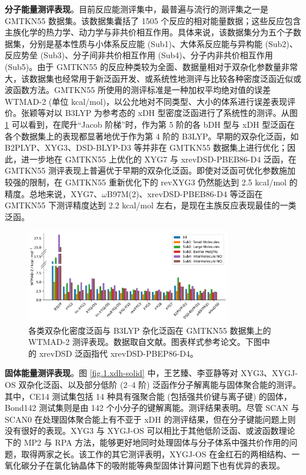 \textbf{分子能量测评表现}。目前反应能测评集中，最普遍与流行的测评集之一是 GMTKN55 数据集\cite{Goerigk-Grimme.PCCP.2017}。该数据集囊括了 1505 个反应的相对能量数据；这些反应包含主族化学的热力学、动力学与非共价相互作用。具体来说，该数据集分为五个子数据集，分别是基本性质与小体系反应能 (Sub1)、大体系反应能与异构能 (Sub2)、反应势垒 (Sub3)、分子间非共价相互作用 (Sub4)、分子内非共价相互作用 (Sub5)。由于 GMTKN55 的反应种类较为全面、数据量相对于双杂化参数量非常大，该数据集也经常用于新泛函开发、或系统性地测评与比较各种密度泛函近似或波函数方法。GMTKN55 所使用的测评标准是一种加权平均绝对值的误差 WTMAD-2 (单位 kcal/mol)，以公允地对不同类型、大小的体系进行误差表现评价。张颖等对以 B3LYP 为参考态的 xDH 型密度泛函进行了系统性的测评\cite{Zhang-Xu.JPCL.2021}。从图 \ref{fig.1.xdh-b3lyp-wtmad} 可以看到，在爬升“Jacob 阶梯”时，作为第 5 阶的各 bDH 型与 xDH 型泛函在各个数据集上的表现都显著地优于作为第 4 阶的 B3LYP。早期的双杂化泛函，如 B2PLYP、XYG3、DSD-BLYP-D3 等并非在 GMTKN55 数据集上进行优化；因此，进一步地在 GMTKN55 上优化的 XYG7 与 xrevDSD-PBEB86-D4 泛函，在 GMTKN55 测评表现上普遍优于早期的双杂化泛函。即使对泛函可优化参数施加较强的限制，在 GMTKN55 重新优化下的 revXYG3 仍然能达到 2.5 kcal/mol 的精度。总地来说，XYG7、$\omega$B97M(2)、xrevDSD-PBEB86-D4 等泛函在 GMTKN55 下测评精度达到 2.2 kcal/mol 左右，是现在主族反应表现最佳的一类泛函。

\begin{figure}[h]
  \centering
  \includegraphics[width=0.8\textwidth]{assets/xdh-b3lyp-wtmad.pdf}
  \caption[双杂化泛函对 GMTKN55 数据集的测评]{各类双杂化密度泛函与 B3LYP 杂化泛函在 GMTKN55 数据集上的 WTMAD-2 测评表现。数据取自文献\cite{Zhang-Xu.JPCL.2021}。图表样式参考论文\cite{Yan.Thesis.2022}。下图中的 xrevDSD 泛函指代 xrevDSD-PBEP86-D4。}
  \label{fig.1.xdh-b3lyp-wtmad}
\end{figure}

\textbf{固体能量测评表现}。图 \ref{fig.1.xdh-solid} 中，王艺臻、李亚静等对 XYG3、XYGJ-OS 双杂化泛函、以及部分低阶 (2--4 阶) 泛函作分子解离能与固体聚合能的测评\cite{Wang-Xu.JA.2021}。其中，CE14 测试集包括 14 种具有强聚合能 (包括强共价键与离子键) 的固体，Bond142 测试集则是由 142 个小分子的键解离能。测评结果表明。尽管 SCAN 与 SCAN0 在处理固体聚合能上有不亚于 xDH 的测评结果，但在分子键能问题上则没有很好的表现。XYG3 与 XYGJ-OS 可以相比于其他低阶泛函、或波函数理论下的 MP2 与 RPA 方法，能够更好地同时处理固体与分子体系中强共价作用的问题，取得两家之长。该工作的其它测评表明，XYGJ-OS 在金红石的两相结构、一氧化碳分子在氯化钠晶体下的吸附能等典型固体计算问题下也有优异的表现。

